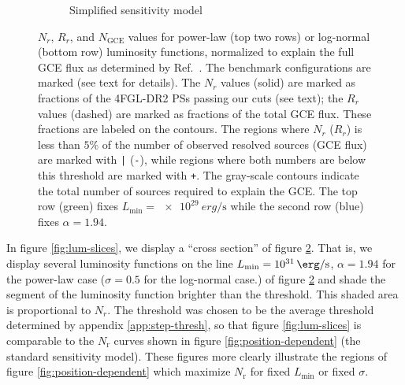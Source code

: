 \documentclass[letter,11pt]{article}
\begin{document}
\begin{figure}
\begin{subfigure}[b]{0.49\textwidth}
        \caption{Simplified sensitivity model}
        \label{fig:step-function}
    \end{subfigure}
    \caption{$N_r$, $R_r$, and $N_\text{GCE}$ values for power-law (top two rows) or log-normal (bottom row) luminosity functions, normalized to explain the full GCE flux as determined by Ref.~\cite{DiMauro:2021raz}. The benchmark configurations are marked (see text for details). The $N_r$ values (solid) are marked as fractions of the 4FGL-DR2 PSs passing our cuts (see text); the $R_r$ values (dashed) are marked as fractions of the total GCE flux. These fractions are labeled on the contours. The regions where $N_r$ ($R_r$) is less than $5\%$ of the number of observed resolved sources (GCE flux) are marked with \texttt{|} (\texttt{-}), while regions where both numbers are below this threshold are marked with \texttt{+}. The gray-scale contours indicate the total number of sources required to explain the GCE. The top row (green) fixes $L_\text{min}=\SI{e29}{erg\per\second}$ while the second row (blue) fixes $\alpha=1.94$.}
    \label{fig:step-and-pos}
\end{figure}

In figure \ref{fig:lum-slices}, we display a ``cross section'' of figure \ref{fig:step-and-pos}. That is, we display several luminosity functions on the line $L_\text{min}=\SI{e31}{\erg\per\second}$, $\alpha=1.94$ for the power-law case ($\sigma=0.5$ for the log-normal case.) of figure \ref{fig:step-and-pos} and shade the segment of the luminosity function brighter than the threshold. This shaded area is proportional to $N_r$. The threshold was chosen to be the average threshold determined by appendix \ref{app:step-thresh}, so that figure \ref{fig:lum-slices} is comparable to the $N_\text{r}$ curves shown in figure \ref{fig:position-dependent} (the standard sensitivity model). These figures more clearly illustrate the regions of figure \ref{fig:position-dependent} which maximize $N_\text{r}$ for fixed $L_\text{min}$ or fixed $\sigma$.
\end{document}

